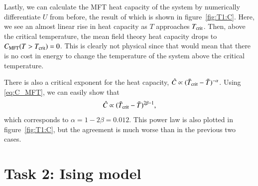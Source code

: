 Lastly, we can calculate the MFT heat capacity of the system by
numerically differentiate $U$ from before, the result of which is
shown in figure~\ref{fig:T1:C}. Here, we see an almost linear rise in
heat capacity as $T$ approaches $T_{\rm crit}$. Then, above the
critical temperature, the mean field theory heat capacity drops to
$C_{\text{MFT}}(T>T_{\rm crit})=0$. This is clearly not physical since that
would mean that there is no cost in energy to change the temperature
of the system above the critical temperature.

There is also a critical exponent for the heat capacity,
$\hat{C}\propto(\bar{T}_{\rm crit}-\bar{T})^{-\alpha}$. Using
\eqref{eq:C_MFT}, we can easily show that
\begin{equation}
\hat{C}\propto(\bar{T}_{\rm crit}-\bar{T})^{2\beta-1},
\end{equation}
which corresponds to $\alpha=1-2\beta=0.012$. This power law is also
plotted in figure~\ref{fig:T1:C}, but the agreement is much worse than
in the previous two cases.




\section*{Task 2: Ising model}

